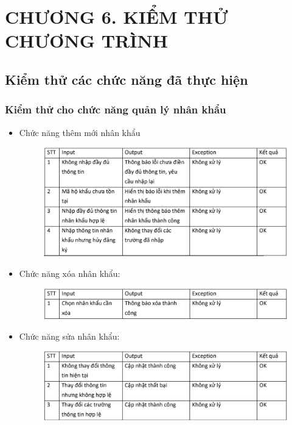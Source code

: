 \documentclass{article}
\begin{document}
\section*{CHƯƠNG 6. KIỂM THỬ CHƯƠNG TRÌNH}
\setcounter{section}{6}
\setcounter{subsection}{0}
\subsection{Kiểm thử các chức năng đã thực hiện}
\subsubsection{Kiểm thử cho chức năng quản lý nhân khẩu}
\begin{itemize}
    \item Chức năng thêm mới nhân khẩu
    \begin{figure}[H]
        \centering
        \includegraphics[width=1\textwidth]{Kiểm thử nhân khẩu/Screenshot 2024-12-13 235715.png}
    \end{figure}
    \item Chức năng xóa nhân khẩu:
    \begin{figure}[H]
        \centering
        \includegraphics[width=1\textwidth]{Kiểm thử nhân khẩu/Screenshot 2024-12-13 235722.png}
    \end{figure}
    \item Chức năng sửa nhân khẩu:
    \begin{figure}[H]
        \centering
        \includegraphics[width=1\textwidth]{Kiểm thử nhân khẩu/Screenshot 2024-12-13 235731.png}

\end{figure}
\end{itemize}
\end{document}
